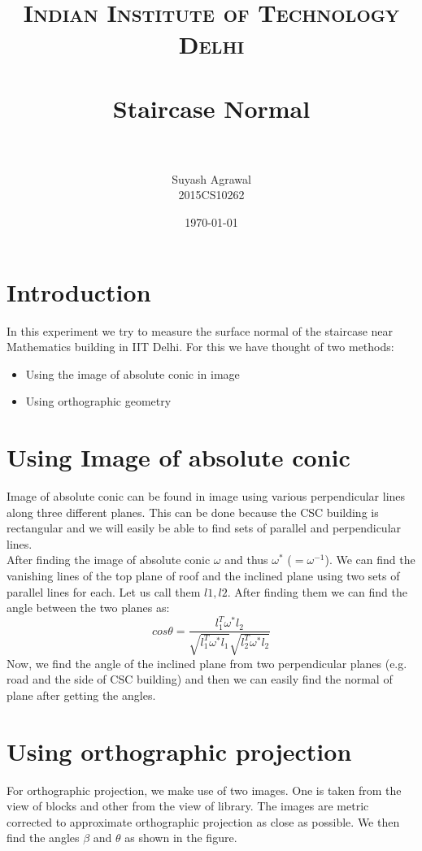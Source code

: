 \documentclass[paper=a4, fontsize=11pt]{scrartcl} %
\title{	
\normalfont \normalsize 
\textsc{Indian Institute of Technology Delhi} \\ [25pt] %
\horrule{0.5pt} \\[0.4cm] %
\huge Staircase Normal \\ %
\horrule{2pt} \\[0.5cm] %
}
\author{Suyash Agrawal \\ 2015CS10262} %
\date{\normalsize\today} %
\begin{document}
\maketitle %

\section{Introduction}
In this experiment we try to measure the surface normal of the staircase near Mathematics building in IIT Delhi.
For this we have thought of two methods:
\begin{itemize}
    \item Using the image of absolute conic in image
    \item Using orthographic geometry
\end{itemize}


\section{Using Image of absolute conic}
Image of absolute conic can be found in image using various perpendicular lines along three different planes.
This can be done because the CSC building is rectangular and we will easily be able to find sets of parallel and
perpendicular lines.\\
After finding the image of absolute conic $\omega$ and thus $\omega^*$ ($= \omega^{-1}$). We can find the
vanishing lines of the top plane of roof and the inclined plane using two sets of parallel lines for each.
Let us call them $l1,l2$. After finding them we can find the angle between the two planes as:
$$
cos \theta = \frac{l_1^{T}\omega^*l_2}{\sqrt{l_1^{T}\omega^*l_1}\sqrt{l_2^{T}\omega^*l_2}}
$$
Now, we find the angle of the inclined plane from two perpendicular planes (e.g. road and the side of CSC
building) and then we can easily find the normal of plane after getting the angles.

\section{Using orthographic projection}
For orthographic projection, we make use of two images. One is taken from the view of blocks and other
from the view of library. The images are metric corrected to approximate orthographic projection as close as possible.
We then find the angles $\beta$ and $\theta$ as shown in the figure.\\
\end{document}
